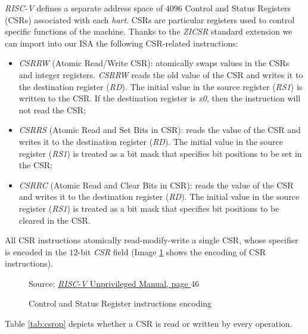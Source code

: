 \textit{RISC-V} defines a separate address space of $4096$ Control and Status
Registers (CSRs) associated with each \textit{hart}. CSRs are particular
registers used to control specific functions of the machine. Thanks to the \textit{ZICSR}
standard extension we can import into our ISA the following CSR-related
instructions:
\begin{itemize}
  \item \textit{CSRRW} (Atomic Read/Write CSR): atomically swaps values in the CSRs
    and integer registers. \textit{CSRRW} reads the old value of the CSR and writes
    it to the destination register (\textit{RD}). The initial value in the source
    register (\textit{RS1}) is written to the CSR. If the destination register is
    \textit{x0}, then the instruction will not read the CSR;

  \item \textit{CSRRS} (Atomic Read and Set Bits in CSR): reads the value of the
    CSR and writes it to the destination register (\textit{RD}). The initial value
    in the source register (\textit{RS1}) is treated as a bit mask that
    specifies bit positions to be set in the CSR;

  \item \textit{CSRRC} (Atomic Read and Clear Bits in CSR): reads the value of the
    CSR and writes it to the destination register (\textit{RD}). The initial value
    in the source register (\textit{RS1}) is treated as a bit mask that
    specifies bit positions to be cleared in the CSR.
\end{itemize}
All CSR instructions atomically read-modify-write a single CSR, whose specifier
is encoded in the $12$-bit \textit{CSR} field (Image \ref{fig:csrinstr} shows
the encoding of CSR instructions).

\begin{figure}[htbp]
  \centering
  \def\stackalignment{r} %
  {\scriptsize Source: \href{https://drive.google.com/file/d/1uviu1nH-tScFfgrovvFCrj7Omv8tFtkp/view}{\textit{RISC-V} Unprivileged Manual, page $46$}}
  \caption{Control and Status Register instructions encoding}
  \label{fig:csrinstr}
\end{figure}

Table \ref{tab:csrop} depicts whether a CSR is read or written by every
operation.

